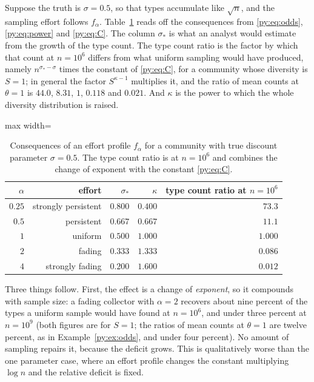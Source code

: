 Suppose the truth is $\sigma = 0.5$, so that types accumulate like $\sqrt{n}$, and the sampling
effort follows $f_\alpha$. Table~\ref{py:tab:worked} reads off the consequences from
\eqref{py:eq:odds}, \eqref{py:eq:power} and \eqref{py:eq:C}. The column $\sigma_*$ is what an analyst would estimate from the growth of the type count. The
type count ratio is the factor by which that count at $n = 10^{6}$ differs from what uniform
sampling would have produced, namely $n^{\sigma_*-\sigma}$ times the constant of \eqref{py:eq:C}, for a community whose diversity is $S = 1$; in general the factor $S^{\kappa-1}$ multiplies it, and the ratio of mean counts at $\theta = 1$ is $44.0$, $8.31$, $1$, $0.118$ and $0.021$. And
$\kappa$ is the power to which the whole diversity distribution is raised.

\begin{table}[t]
\centering
\caption{Consequences of an effort profile $f_\alpha$ for a community with true discount parameter
$\sigma = 0.5$. The type count ratio is at $n = 10^{6}$ and combines the change of exponent with
the constant \eqref{py:eq:C}.}
\label{py:tab:worked}
\begin{adjustbox}{max width=\textwidth}
\begin{tabular}{rrrrr}
\toprule
$\alpha$ & effort & $\sigma_*$ & $\kappa$ & type count ratio at $n=10^{6}$\\
\midrule
$0.25$ & strongly persistent & $0.800$ & $0.400$ & $73.3$\\
$0.5$  & persistent          & $0.667$ & $0.667$ & $11.1$\\
$1$    & uniform             & $0.500$ & $1.000$ & $1.000$\\
$2$    & fading              & $0.333$ & $1.333$ & $0.086$\\
$4$    & strongly fading     & $0.200$ & $1.600$ & $0.012$\\
\bottomrule
\end{tabular}
\end{adjustbox}
\end{table}

Three things follow. First, the effect is a change of \emph{exponent}, so it compounds with
sample size: a fading collector with $\alpha = 2$ recovers about nine percent of the types a
uniform sample would have found at $n = 10^{6}$, and under three percent at $n = 10^{9}$ (both figures are for $S = 1$; the ratios of mean counts at $\theta = 1$ are twelve percent, as in Example~\ref{py:ex:odds}, and under four percent).
No amount of sampling repairs it, because the deficit grows. This is qualitatively worse than the
one parameter case, where an effort profile changes the constant multiplying $\log n$ and the
relative deficit is fixed.

